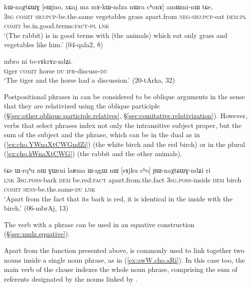 \begin{exe}
\ex \label{ex:cho.kWnaXtCWG}
 kɯ-naχtɕɯɣ [sɯjno, xɕaj ma mɤ-kɯ-ndza nɯra cʰonɤ] amɯmi-nɯ tɕe, \\
\textsc{3sg} \textsc{comit} \textsc{sbj}:\textsc{pcp}-be.the.same vegetables grass apart.from \textsc{neg}-\textsc{sbj}:\textsc{pcp}-eat \textsc{dem}:\textsc{pl} \textsc{comit} be.in.good.terms:\textsc{fact}-\textsc{pl} \textsc{lnk} \\
\glt `(The rabbit) is in good terms with (the animals) which eat only grass and vegetables like him.' (04-qala2, 8)
\end{exe}

\begin{exe}
\ex \label{ex:cho.torAkrAzndZi}
 mbro ni to-rɤkrɤz-ndʑi. \\
tiger \textsc{comit} horse \textsc{du} \textsc{ifr}-discuss-\textsc{du} \\
\glt `The tiger and the horse had a discussion.' (20-tArka, 32)
\end{exe}

Postpositional phrases in  can be considered to be oblique arguments in the sense that they are relativized using the oblique participle (§\ref{sec:other.oblique.participle.relatives}, §\ref{sec:comitative.relativization}). However, verbs that select  phrases index not only the intransitive subject proper, but the sum of the subject and the  phrase, which can be in the dual as in (\ref{ex:cho.YWnaXtCWGndZi}) (the white birch and the red birch) or in the plural (\ref{ex:cho.kWnaXtCWG}) (the rabbit and the other animals). 

\begin{exe}
\ex \label{ex:cho.YWnaXtCWGndZi}
\gll tɕe ɯ-rqʰu nɯ ɣɯrni laʁma ɯ-ŋgɯ nɯ [sɤjku cʰo] ɲɯ-naχtɕɯɣ-ndʑi ri\\
\textsc{lnk} \textsc{3sg}.\textsc{poss}-bark \textsc{dem} be.red:\textsc{fact} apart.from.the.fact \textsc{3sg}.\textsc{poss}-inside \textsc{dem} birch \textsc{comit} \textsc{sens}-be.the.same-\textsc{du} \textsc{lnk} \\
\glt `Apart from the fact that its bark is red, it is identical in the inside with the birch.' (06-mbrAj, 13)
\end{exe}

The verb  with a  phrase can be used in an equative construction (§\ref{sec:nmlz.equative}).

 Apart from the function presented above,  is commonly used to link together two nouns inside a single noun phrase, as in (\ref{ex:awW.cho.aRi}). In this case too, the main verb of the clause indexes the whole noun phrase, comprising the sum of referents designated by the nouns linked by .


